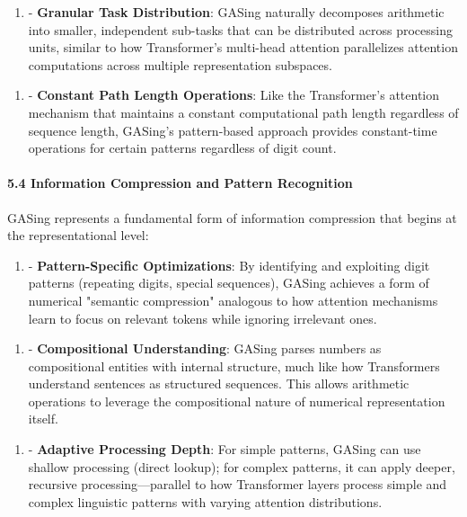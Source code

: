 \begin{enumerate}
  \item - \textbf{Granular Task Distribution}: GASing naturally decomposes arithmetic into smaller, independent sub-tasks that can be distributed across processing units, similar to how Transformer's multi-head attention parallelizes attention computations across multiple representation subspaces.
\end{enumerate}

\begin{enumerate}
  \item - \textbf{Constant Path Length Operations}: Like the Transformer's attention mechanism that maintains a constant computational path length regardless of sequence length, GASing's pattern-based approach provides constant-time operations for certain patterns regardless of digit count.
\end{enumerate}

\paragraph{5.4 Information Compression and Pattern Recognition}
GASing represents a fundamental form of information compression that begins at the representational level:

\begin{enumerate}
  \item - \textbf{Pattern-Specific Optimizations}: By identifying and exploiting digit patterns (repeating digits, special sequences), GASing achieves a form of numerical "semantic compression" analogous to how attention mechanisms learn to focus on relevant tokens while ignoring irrelevant ones.
\end{enumerate}

\begin{enumerate}
  \item - \textbf{Compositional Understanding}: GASing parses numbers as compositional entities with internal structure, much like how Transformers understand sentences as structured sequences. This allows arithmetic operations to leverage the compositional nature of numerical representation itself.
\end{enumerate}

\begin{enumerate}
  \item - \textbf{Adaptive Processing Depth}: For simple patterns, GASing can use shallow processing (direct lookup); for complex patterns, it can apply deeper, recursive processing—parallel to how Transformer layers process simple and complex linguistic patterns with varying attention distributions.
\end{enumerate}

